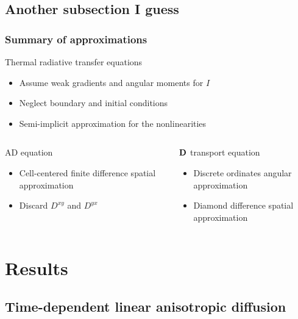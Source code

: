 \documentclass{beamer}
\newcommand{\Dtens}{\mat{D}}
\begin{document}
\subsection{Another subsection I guess}
\begin{frame}
  \frametitle{Summary of approximations}
  \begin{block}{Thermal radiative transfer equations}
    \begin{itemize}
      \item Assume weak gradients and angular moments for $I$
      \item Neglect boundary and initial conditions
      \item Semi-implicit approximation for the nonlinearities
    \end{itemize}
  \end{block}
  \begin{columns}[t]
    \begin{column}{.48\textwidth}
  \begin{block}{AD equation}
    \begin{itemize}
      \item Cell-centered finite difference spatial approximation
      \item Discard $D^{xy}$ and $D^{yx}$
    \end{itemize}
  \end{block}
    \end{column}
    \begin{column}{.48\textwidth}
  \begin{block}{$\Dtens$ transport equation}
    \begin{itemize}
      \item Discrete ordinates angular approximation
      \item Diamond difference spatial approximation
    \end{itemize}
  \end{block}
    \end{column}
  \end{columns}
\end{frame}
\section{Results}
\subsection{Time-dependent linear anisotropic diffusion}
\end{document}
